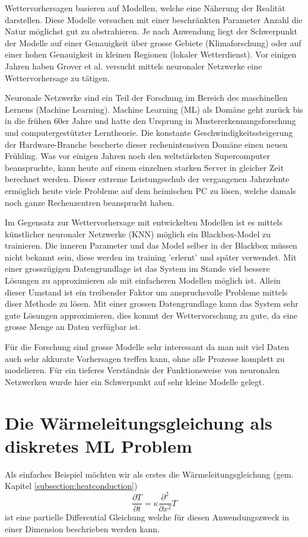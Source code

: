 Wettervorhersagen basieren auf Modellen, welche eine Näherung der Realität darstellen. Diese Modelle versuchen mit einer beschränkten Parameter Anzahl die Natur möglichst gut zu abstrahieren. Je nach Anwendung liegt der Schwerpunkt der Modelle auf einer Genauigkeit über grosse Gebiete (Klimaforschung) oder auf einer hohen Genauigkeit in kleinen Regionen (lokaler Wetterdienst). Vor einigen Jahren haben Grover et al. \cite{grover:2015} versucht mittels neuronaler Netzwerke eine Wettervorhersage zu tätigen.

Neuronale Netzwerke sind ein Teil der Forschung im Bereich des maschinellen Lernens (Machine Learning). Machine Learning (ML) als Domäne geht zurück bis in die frühen 60er Jahre und hatte den Ursprung in Mustererkennungsforschung und computergestützter Lerntheorie. Die konstante Geschwindigkeitssteigerung der Hardware-Branche bescherte dieser rechenintensiven Domäne einen neuen Frühling. Was vor einigen Jahren noch den weltstärksten Supercomputer beanspruchte, kann heute auf einem einzelnen starken Server in gleicher Zeit berechnet werden. Dieser extreme Leistungsschub der vergangenen Jahrzehnte ermöglich heute viele Probleme auf dem heimischen PC zu lösen, welche damals noch ganze Rechenzentren beansprucht haben.

Im Gegensatz zur Wettervorhersage mit entwickelten Modellen ist es mittels künstlicher neuronaler Netzwerke (KNN) möglich ein Blackbox-Model zu trainieren. Die inneren Parameter und das Model selber in der Blackbox müssen nicht bekannt sein, diese werden im training 'erlernt' und später verwendet. Mit einer grosszügigen Datengrundlage ist das System im Stande viel bessere Lösungen zu approximieren als mit einfacheren Modellen möglich ist. Allein dieser Umstand ist ein treibender Faktor um anspruchsvolle Probleme mittels diser Methode zu lösen. Mit einer grossen Datengrundlage kann das System sehr gute Lösungen approximieren, dies kommt der Wettervorschung zu gute, da eine grosse Menge an Daten verfügbar ist.

Für die Forschung sind grosse Modelle sehr interessant da man mit viel Daten auch sehr akkurate Vorhersagen treffen kann, ohne alle Prozesse komplett zu modelieren. Für ein tieferes Verständnis der Funktionsweise von neuronalen Netzwerken wurde hier ein Schwerpunkt auf sehr kleine Modelle gelegt. 

\section{Die Wärmeleitungsgleichung als diskretes ML Problem}
Als einfaches Beispiel möchten wir als erstes die Wärmeleitungsgleichung (gem. Kapitel \ref{subsection:heatconduction}) 
\begin{equation}
\frac{\partial T}{\partial t} = \kappa \frac{\partial^2}{\partial x^2} T
\label{eq:waermeleitung-1d}
\end{equation}
ist eine partielle Differential Gleichung welche für diesen Anwendungszweck in einer Dimension beschrieben werden kann.

